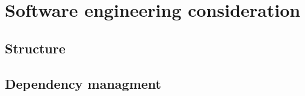 \chapter{Software engineering consideration}
\label{chap:software_engineering_consideration}


\section{Structure}

\section{Dependency managment}

